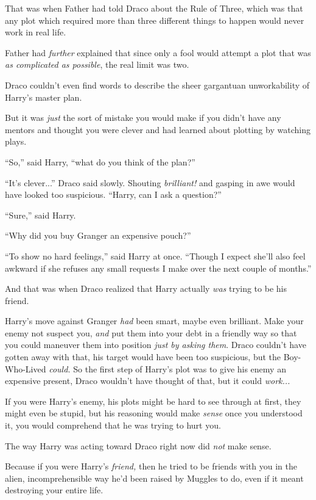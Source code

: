 That was when Father had told Draco about the Rule of Three, which was
that any plot which required more than three different things to happen
would never work in real life.

Father had \emph{further} explained that since only a fool would attempt
a plot that was \emph{as complicated as possible}, the real limit was
two.

Draco couldn't even find words to describe the sheer gargantuan
unworkability of Harry's master plan.

But it was \emph{just} the sort of mistake you would make if you didn't
have any mentors and thought you were clever and had learned about
plotting by watching plays.

``So,'' said Harry, ``what do you think of the plan?''

``It's clever...'' Draco said slowly. Shouting \emph{brilliant!}
and gasping in awe would have looked too suspicious. ``Harry, can I ask
a question?''

``Sure,'' said Harry.

``Why did you buy Granger an expensive pouch?''

``To show no hard feelings,'' said Harry at once. ``Though I expect
she'll also feel awkward if she refuses any small requests I make over
the next couple of months.''

And that was when Draco realized that Harry actually \emph{was} trying
to be his friend.

Harry's move against Granger \emph{had} been smart, maybe even
brilliant. Make your enemy not suspect you, \emph{and} put them into
your debt in a friendly way so that you could maneuver them into
position \emph{just by asking them}. Draco couldn't have gotten away
with that, his target would have been too suspicious, but the
Boy-Who-Lived \emph{could.} So the first step of Harry's plot was to
give his enemy an expensive present, Draco wouldn't have thought of
that, but it could \emph{work...}

If you were Harry's enemy, his plots might be hard to see through at
first, they might even be stupid, but his reasoning would make
\emph{sense} once you understood it, you would comprehend that he was
trying to hurt you.

The way Harry was acting toward Draco right now did \emph{not} make
sense.

Because if you were Harry's \emph{friend,} then he tried to be friends
with you in the alien, incomprehensible way he'd been raised by Muggles
to do, even if it meant destroying your entire life.

